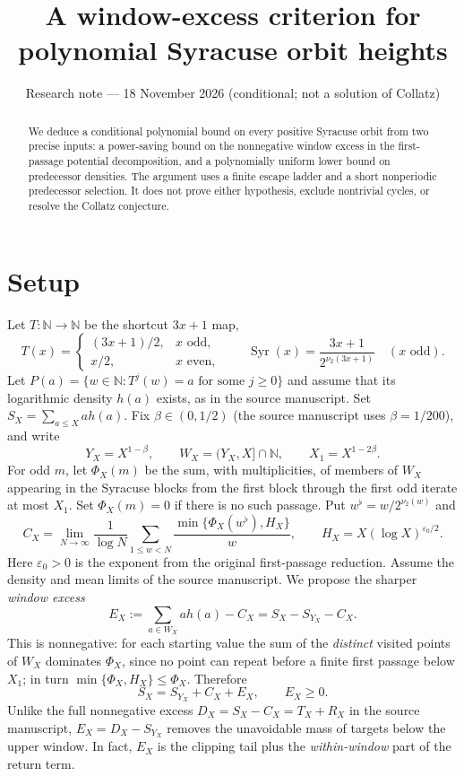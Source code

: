\documentclass[11pt]{amsart}
\title{A window-excess criterion for polynomial Syracuse orbit heights}
\date{Research note --- 18 November 2026 (conditional; not a solution of Collatz)}
\theoremstyle{remark}
\newcommand{\N}{\mathbb N}
\newcommand{\Syr}{\operatorname{Syr}}
\begin{document}
\maketitle
\begin{abstract}
We deduce a conditional polynomial bound on every positive Syracuse orbit
from two precise inputs: a power-saving bound on the nonnegative window excess
in the first-passage potential decomposition, and a polynomially uniform
lower bound on predecessor densities. The argument uses a finite escape ladder
and a short nonperiodic predecessor selection. It does not prove either
hypothesis, exclude nontrivial cycles, or resolve the Collatz conjecture.
\end{abstract}

\section{Setup}
Let $T:\N\to\N$ be the shortcut $3x+1$ map,
\[
T(x)=\begin{cases}(3x+1)/2,&x\text{ odd},\\x/2,&x\text{ even},\end{cases}
\qquad \Syr(x)=\frac{3x+1}{2^{\nu_2(3x+1)}}\quad(x\text{ odd}).
\]
Let $P(a)=\{w\in\N:T^j(w)=a\text{ for some }j\ge0\}$ and assume
that its logarithmic density $h(a)$ exists, as in the source manuscript.
Set $S_X=\sum_{a\le X}a h(a)$. Fix $\beta\in(0,1/2)$ (the source
manuscript uses $\beta=1/200$), and write
\[
Y_X=X^{1-\beta},\qquad W_X=(Y_X,X]\cap\N,\qquad X_1=X^{1-2\beta}.
\]
For odd $m$, let $\Phi_X(m)$ be the sum, with multiplicities, of
members of $W_X$ appearing in the Syracuse blocks from the first block
through the first odd iterate at most $X_1$. Set $\Phi_X(m)=0$
if there is no such passage. Put $w^\flat=w/2^{\nu_2(w)}$ and
\[
C_X=\lim_{N\to\infty}\frac1{\log N}\sum_{1\le w<N}
\frac{\min\{\Phi_X(w^\flat),H_X\}}{w},\qquad
H_X=X(\log X)^{\varepsilon_0/2}.
\]
Here $\varepsilon_0>0$ is the exponent from the original first-passage
reduction. Assume the density and mean limits of the source manuscript.
We propose the sharper \emph{window excess}
\[
E_X:=\sum_{a\in W_X}a h(a)-C_X
=S_X-S_{Y_X}-C_X.\tag{1}
\]
This is nonnegative: for each starting value the sum of the \emph{distinct}
visited points of $W_X$ dominates $\Phi_X$, since no point can repeat
before a finite first passage below $X_1$; in turn
$\min\{\Phi_X,H_X\}\le\Phi_X$. Therefore
\[
\boxed{S_X=S_{Y_X}+C_X+E_X,\qquad E_X\ge0.}\tag{2}
\]
Unlike the full nonnegative excess $D_X=S_X-C_X=T_X+R_X$ in the source
manuscript, $E_X=D_X-S_{Y_X}$ removes the unavoidable mass of targets
below the upper window. In fact, $E_X$ is the clipping tail plus the
\emph{within-window} part of the return term.
\end{document}
